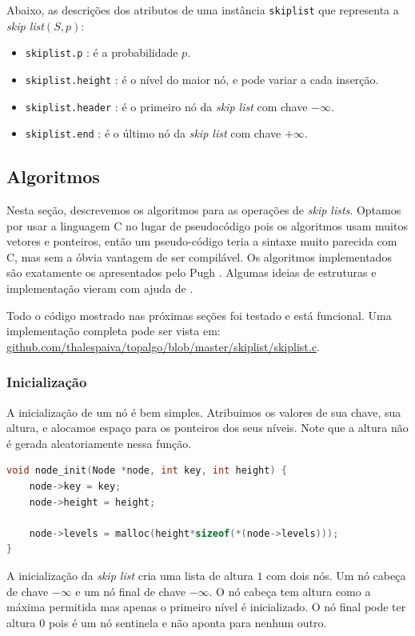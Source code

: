\documentclass[paper=a4, fontsize=11pt]{scrartcl} %
\numberwithin{equation}{section}
\numberwithin{figure}{section}
\numberwithin{table}{section}
\numberwithin{definition}{section}
\numberwithin{theorem}{section}
\numberwithin{property}{section}
\numberwithin{proposition}{section}
\newcommand{\sls}{\textit{skip lists}\xspace}
\newcommand{\skl}{\textit{skip list}\xspace}
\renewcommand{\sl}{\textit{skip list}\xspace}
\begin{document}
Abaixo, as descrições dos atributos de uma instância \verb|skiplist| que representa a 
\skl $( S, p )$:

\begin{itemize}[noitemsep]
  \item \verb|skiplist.p| : é a probabilidade $p$.
  \item \verb|skiplist.height| : é o nível do maior nó, e pode variar a cada inserção.
  \item \verb|skiplist.header| : é o primeiro nó da \sl com chave $-\infty$.
  \item \verb|skiplist.end| : é o último nó da \sl com chave $+\infty$.
\end{itemize}


\subsection{Algoritmos}

Nesta seção, descrevemos os algoritmos para as operações de \sls. Optamos por usar a linguagem C no lugar de 
pseudocódigo pois os algoritmos usam muitos vetores e ponteiros, então um pseudo-código teria a sintaxe muito parecida com
C, mas sem a óbvia vantagem de ser compilável. Os algoritmos implementados são exatamente os apresentados pelo
Pugh \cite{pugh1990skip}. Algumas ideias de estruturas e implementação vieram com ajuda de \cite{goodrich2014data}.

Todo o código mostrado nas próximas seções foi testado e está funcional. Uma implementação completa pode ser vista 
em: \url{github.com/thalespaiva/topalgo/blob/master/skiplist/skiplist.c}.
  
\subsubsection{Inicialização}

A inicialização de um nó é bem simples. Atribuimos os valores de sua chave, sua altura, e alocamos espaço
para os ponteiros dos seus níveis. Note que a altura não é gerada aleatoriamente nessa função.
\begin{lstlisting}[caption=Inicialização de um nó., language=C]
void node_init(Node *node, int key, int height) {
    node->key = key;
    node->height = height;

    node->levels = malloc(height*sizeof(*(node->levels)));
}
\end{lstlisting}

A inicialização da \sl cria uma lista de altura $1$ com dois nós. Um nó cabeça de chave $-\infty$ e um nó final de
chave $-\infty$. O nó cabeça tem altura como a máxima permitida mas apenas o primeiro nível é inicializado. O nó final pode 
ter altura $0$ pois é um nó sentinela e não aponta para nenhum outro.
\end{document}

